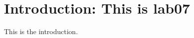 \hypertarget{index_intro_sec}{}\section{Introduction\+: This is lab07}\label{index_intro_sec}
This is the introduction. 